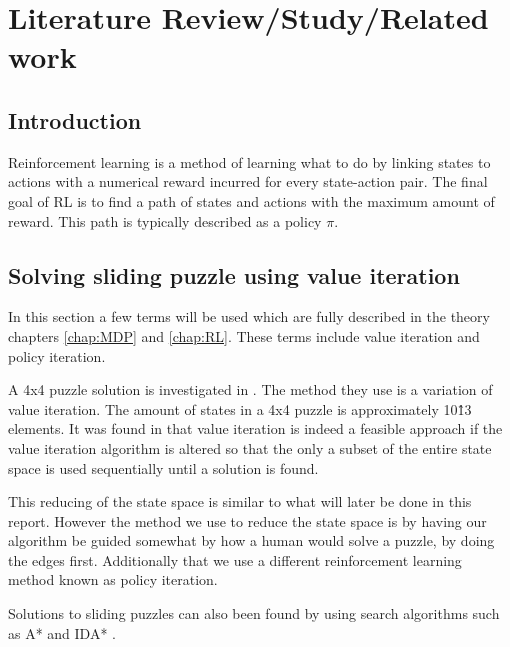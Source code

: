 \graphicspath{{Literature\_Review/fig}}
\chapter{Literature Review/Study/Related work}
\label{chap:Literature_Review}

\section{Introduction}
Reinforcement learning is a method of learning what to do by linking states to actions with a numerical reward incurred for every state-action pair. The final goal of RL is to find a path of states and actions with the maximum amount of reward. \cite{sutton_barto} This path is typically described as a policy $\pi$.

\section{Solving sliding puzzle using value iteration}
In this section a few terms will be used which are fully described in the theory chapters \ref{chap:MDP} and \ref{chap:RL}. These terms include value iteration and policy iteration.

A 4x4 puzzle solution is investigated in \cite{15-puzzle_value_iteration}.
The method they use is a variation of value iteration. The amount of states in a 4x4 puzzle is approximately 10\^13 elements.
It was found in \cite{15-puzzle_value_iteration} that value iteration is indeed a feasible approach if the value iteration algorithm is altered so that the only a subset of the entire state space is used sequentially until a solution is found. 

This reducing of the state space is similar to what will later be done in this report. However the method we use to reduce the state space is by having our algorithm be guided somewhat by how a human would solve a puzzle, by doing the edges first. Additionally that we use a different reinforcement learning method known as policy iteration.


Solutions to sliding puzzles can also been found by using search algorithms such as A* and IDA*
\cite{search_alg}.
